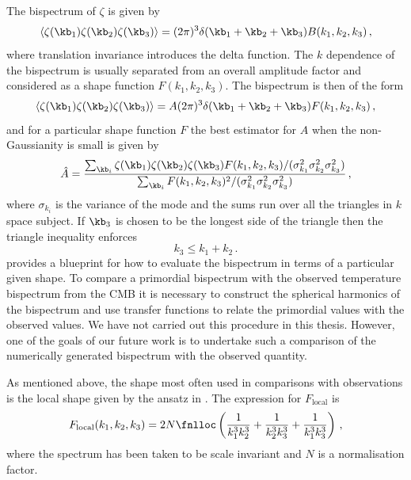 The bispectrum of $\zeta$ is given by
% 
\begin{equation}
 \langle \zeta(\kb_1)\zeta(\kb_2)\zeta(\kb_3)\rangle = 
        (2\pi)^3 \delta(\kb_1+\kb_2+\kb_3) B(k_1,k_2,k_3)\,,
\end{equation}
% 
where translation invariance introduces the delta function. The $k$ dependence of the bispectrum 
is usually separated from an overall amplitude factor and considered as a shape function
$F(k_1,k_2,k_3)$. The bispectrum is then of the form \cite{Liguori:2010hx, Babich:2004gb}
% 
\begin{equation}
 \langle \zeta(\kb_1)\zeta(\kb_2)\zeta(\kb_3)\rangle = 
        A (2\pi)^3 \delta(\kb_1 + \kb_2 + \kb_3) F(k_1,k_2,k_3)\,,
\end{equation}
% 
and for a particular shape function $F$ the best estimator for $A$ when the non-Gaussianity is
small is given by \cite{Babich:2004gb}
% 
\begin{equation}
\label{eq:fnlampl-apx}
\hat{A} = \frac{\sum_{\kb_i} \zeta(\kb_1)\zeta(\kb_2)\zeta(\kb_3) F(k_1,k_2,k_3)/ 
                (\sigma^2_{k_1}\sigma^2_{k_2}\sigma^2_{k_3}) }
                {\sum_{\kb_i} F(k_1,k_2,k_3)^2/(\sigma^2_{k_1}\sigma^2_{k_2}\sigma^2_{k_3})} \,,
\end{equation}
% 
where $\sigma_{k_i}$ is the variance of the mode and the sums run over all the triangles in $k$
space subject. If $\kb_3$ is chosen to be the longest side of the triangle then the triangle
inequality enforces
% 
\begin{equation}
 k_3 \le k_1 + k_2\,.
\end{equation}
% 
 provides a blueprint for how to evaluate the bispectrum in terms of a
particular given shape. To compare a primordial bispectrum with the observed temperature bispectrum
from the CMB it is necessary to construct the spherical harmonics of the bispectrum and use
transfer functions to relate the primordial values with the observed values. We have not
carried out this procedure in this thesis. However, one of the goals of our future work is to
undertake such a comparison of the numerically generated bispectrum with the observed quantity. 

As mentioned above, the shape most often used in comparisons with observations is the local shape
given by the
ansatz in . The expression for $F_\mathrm{local}$ is
\cite{Babich:2004gb, Komatsu:2010fb}
% 
\begin{equation}
 F_\mathrm{local}(k_1,k_2,k_3) = 2N\fnlloc \left(\frac{1}{k_1^3 k_2^3}
                                  +\frac{1}{k_2^3 k_3^3} + \frac{1}{k_1^3 k_3^3}\right) \,,
\end{equation}
% 
where the spectrum has been taken to be scale invariant and $N$ is a normalisation factor. 

